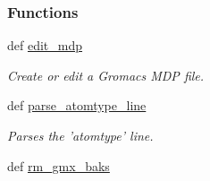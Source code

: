 \subsubsection*{Functions}
\begin{DoxyCompactItemize}
\item 
def \hyperlink{namespaceforcebalance_1_1gmxio_acc5bef2c5c991cd70a948a1dd43ef6a6}{edit\-\_\-mdp}
\begin{DoxyCompactList}\small\item\em Create or edit a Gromacs M\-D\-P file. \end{DoxyCompactList}\item 
def \hyperlink{namespaceforcebalance_1_1gmxio_a29af6ace00d7e58258e0a854ca13d954}{parse\-\_\-atomtype\-\_\-line}
\begin{DoxyCompactList}\small\item\em Parses the 'atomtype' line. \end{DoxyCompactList}\item 
def \hyperlink{namespaceforcebalance_1_1gmxio_acac8488f29b62fb0d4cb54bb5a041026}{rm\-\_\-gmx\-\_\-baks}
\end{DoxyCompactItemize}
